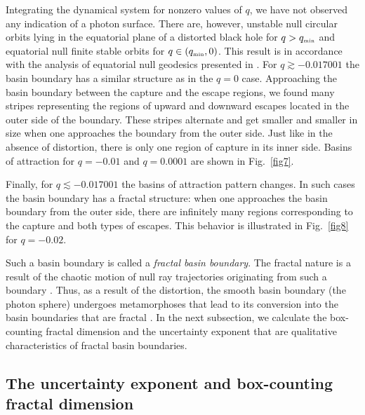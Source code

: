 \documentclass[twocolumn,showpacs,preprintnumbers,amsmath,amssymb,floatfix,nofootinbib]{revtex4-1}
\newcommand{\ind}[1]{\mbox{\tiny #1}}
\begin{document}
Integrating the dynamical system for nonzero values of $q$, we have not observed any indication of a photon surface. There are, however, unstable null circular orbits lying in the equatorial plane of a distorted black hole for $q>q_{\ind{min}}$ and equatorial null finite stable orbits for $q\in(q_{\ind{min}},0)$. This result is in accordance with the analysis of equatorial null geodesics presented in \cite{Shoom:2015slu}. For $q\gtrsim-0.017001$ the basin boundary has a similar structure as in the $q=0$ case. Approaching the basin boundary between the capture and the escape regions, we found many stripes representing the regions of upward and downward escapes located in the outer side of the boundary. These stripes alternate and get smaller and smaller in size when one approaches the boundary from the outer side. Just like in the absence of distortion, there is only one region of capture in its inner side. Basins of attraction for $q=-0.01$ and $q=0.0001$ are shown in Fig.~\ref{fig7}.
 
Finally, for $q\lesssim-0.017001$ the basins of attraction pattern changes. In such cases the basin boundary has a fractal structure: when one approaches the basin boundary from the outer side, there are infinitely many regions corresponding to the capture and both types of escapes. This behavior is illustrated in Fig.~\ref{fig8} for $q=-0.02$.

Such a basin boundary is called a {\em fractal basin boundary}. The fractal nature is a result of the chaotic motion of null ray trajectories originating from such a boundary \cite{MGOY,Ott,GOY1,GOY2}. Thus, as a result of the distortion, the smooth basin boundary (the photon sphere) undergoes metamorphoses that lead to its conversion into the basin boundaries that are fractal \cite{GOY1,GOY2,Ott}. In the next subsection, we calculate the box-counting fractal dimension and the uncertainty exponent that are qualitative characteristics of fractal basin boundaries.

\subsection{The uncertainty exponent and box-counting fractal dimension}  
\end{document}
